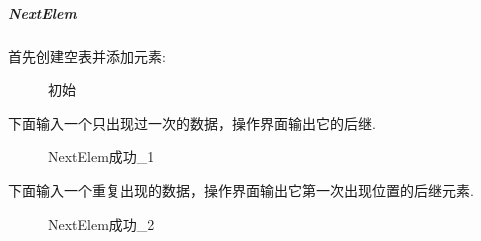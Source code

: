 \documentclass[supercite]{Experimental_Report}
\theoremstyle{definition}
\begin{document}
\subparagraph{NextElem}
\noindent
首先创建空表并添加元素:
\begin{figure}[htbp]
	\centering
	\centering
	\centering
	\caption{初始}
	\label{fig1-36}
\end{figure}

\noindent
下面输入一个只出现过一次的数据，操作界面输出它的后继.
\begin{figure}[htbp]
	\centering
	\centering
	\caption{NextElem成功\_1}
	\label{fig1-37}
\end{figure}

\clearpage
\noindent
下面输入一个重复出现的数据，操作界面输出它第一次出现位置的后继元素.
\begin{figure}[htbp]
	\centering
	\centering
	\caption{NextElem成功\_2}
	\label{fig1-38}
\end{figure}
\end{document}
